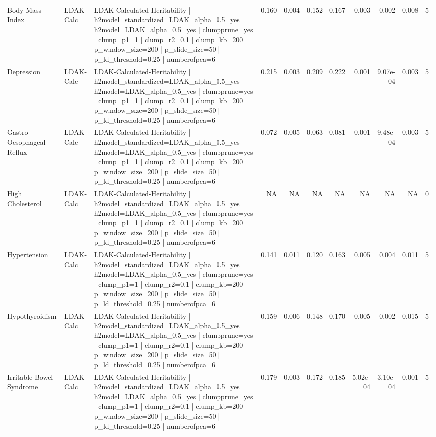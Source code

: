 \begin{landscape}
\begin{longtable}{p{2.4cm}p{1.8cm}p{6.0cm}rrrrrrrr}
Body Mass Index & LDAK-Calc & LDAK-Calculated-Heritability | h2model\_standardized=LDAK\_alpha\_0.5\_yes | h2model=LDAK\_alpha\_0.5\_yes | clumpprune=yes | clump\_p1=1 | clump\_r2=0.1 | clump\_kb=200 | p\_window\_size=200 | p\_slide\_size=50 | p\_ld\_threshold=0.25 | numberofpca=6 & 0.160 & 0.004 & 0.152 & 0.167 & 0.003 & 0.002 & 0.008 & 5 \\
Depression & LDAK-Calc & LDAK-Calculated-Heritability | h2model\_standardized=LDAK\_alpha\_0.5\_yes | h2model=LDAK\_alpha\_0.5\_yes | clumpprune=yes | clump\_p1=1 | clump\_r2=0.1 | clump\_kb=200 | p\_window\_size=200 | p\_slide\_size=50 | p\_ld\_threshold=0.25 | numberofpca=6 & 0.215 & 0.003 & 0.209 & 0.222 & 0.001 & 9.07e-04 & 0.003 & 5 \\
Gastro-Oesophageal Reflux & LDAK-Calc & LDAK-Calculated-Heritability | h2model\_standardized=LDAK\_alpha\_0.5\_yes | h2model=LDAK\_alpha\_0.5\_yes | clumpprune=yes | clump\_p1=1 | clump\_r2=0.1 | clump\_kb=200 | p\_window\_size=200 | p\_slide\_size=50 | p\_ld\_threshold=0.25 | numberofpca=6 & 0.072 & 0.005 & 0.063 & 0.081 & 0.001 & 9.48e-04 & 0.003 & 5 \\
High Cholesterol & LDAK-Calc & LDAK-Calculated-Heritability | h2model\_standardized=LDAK\_alpha\_0.5\_yes | h2model=LDAK\_alpha\_0.5\_yes | clumpprune=yes | clump\_p1=1 | clump\_r2=0.1 | clump\_kb=200 | p\_window\_size=200 | p\_slide\_size=50 | p\_ld\_threshold=0.25 | numberofpca=6 & NA & NA & NA & NA & NA & NA & NA & 0 \\
Hypertension & LDAK-Calc & LDAK-Calculated-Heritability | h2model\_standardized=LDAK\_alpha\_0.5\_yes | h2model=LDAK\_alpha\_0.5\_yes | clumpprune=yes | clump\_p1=1 | clump\_r2=0.1 | clump\_kb=200 | p\_window\_size=200 | p\_slide\_size=50 | p\_ld\_threshold=0.25 | numberofpca=6 & 0.141 & 0.011 & 0.120 & 0.163 & 0.005 & 0.004 & 0.011 & 5 \\
Hypothyroidism & LDAK-Calc & LDAK-Calculated-Heritability | h2model\_standardized=LDAK\_alpha\_0.5\_yes | h2model=LDAK\_alpha\_0.5\_yes | clumpprune=yes | clump\_p1=1 | clump\_r2=0.1 | clump\_kb=200 | p\_window\_size=200 | p\_slide\_size=50 | p\_ld\_threshold=0.25 | numberofpca=6 & 0.159 & 0.006 & 0.148 & 0.170 & 0.005 & 0.002 & 0.015 & 5 \\
Irritable Bowel Syndrome & LDAK-Calc & LDAK-Calculated-Heritability | h2model\_standardized=LDAK\_alpha\_0.5\_yes | h2model=LDAK\_alpha\_0.5\_yes | clumpprune=yes | clump\_p1=1 | clump\_r2=0.1 | clump\_kb=200 | p\_window\_size=200 | p\_slide\_size=50 | p\_ld\_threshold=0.25 | numberofpca=6 & 0.179 & 0.003 & 0.172 & 0.185 & 5.02e-04 & 3.10e-04 & 0.001 & 5 \\

\end{longtable}
\end{landscape}
